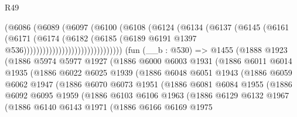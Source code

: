\begin{lexlean}{R49}
\begin{coremodule}
                                    (@6086
                                      (@6089
                                        (@6097
                                          (@6100
                                            (@6108
                                              (@6124
                                                (@6134
                                                  (@6137
                                                    (@6145
                                                      (@6161
                                                        (@6171
                                                          (@6174
                                                            (@6182
                                                              (@6185
                                                                (@6189
                                                                  @6191
                                                                  @1397
                                                                  @536)))))))))))))))))))))))))))))))
    (fun (__b : @530) =>
    @1455
      (@1888
        @1923
        (@1886
          @5974
          @5977
          @1927
          (@1886
            @6000
            @6003
            @1931
            (@1886
              @6011
              @6014
              @1935
              (@1886
                @6022
                @6025
                @1939
                (@1886
                  @6048
                  @6051
                  @1943
                  (@1886
                    @6059
                    @6062
                    @1947
                    (@1886
                      @6070
                      @6073
                      @1951
                      (@1886
                        @6081
                        @6084
                        @1955
                        (@1886
                          @6092
                          @6095
                          @1959
                          (@1886
                            @6103
                            @6106
                            @1963
                            (@1886
                              @6129
                              @6132
                              @1967
                              (@1886
                                @6140
                                @6143
                                @1971
                                (@1886
                                  @6166
                                  @6169
                                  @1975

\end{coremodule}
\end{lexlean}
